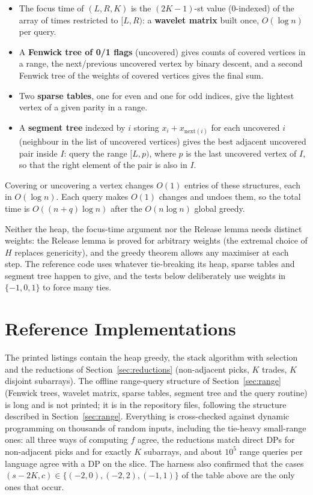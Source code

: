\documentclass[11pt]{article}
\begin{document}
\begin{itemize}[leftmargin=1.5em,itemsep=1pt]
  \item The focus time of $(L,R,K)$ is the $(2K-1)$-st value (0-indexed) of
        the array of times restricted to $[L,R)$: a \textbf{wavelet matrix}
        built once, $O(\log n)$ per query.
  \item A \textbf{Fenwick tree of 0/1 flags} (uncovered) gives counts of
        covered vertices in a range, the next/previous uncovered vertex by
        binary descent, and a second Fenwick tree of the weights of
        covered vertices gives the final sum.
  \item Two \textbf{sparse tables}, one for even and one for odd indices,
        give the lightest vertex of a given parity in a range.
  \item A \textbf{segment tree} indexed by $i$ storing $x_i+x_{\mathrm{next}(i)}$
        for each uncovered $i$ (neighbour in the list of uncovered vertices)
        gives the best adjacent uncovered pair inside $I$: query the range
        $[L,p)$, where $p$ is the last uncovered vertex of $I$, so that
        the right element of the pair is also in $I$.
\end{itemize}
Covering or uncovering a vertex changes $O(1)$ entries of these
structures, each in $O(\log n)$. Each query makes $O(1)$ changes and
undoes them, so the total time is $O((n+q)\log n)$ after the
$O(n\log n)$ global greedy.

\begin{notebox}[On ties]
Neither the heap, the focus-time argument nor the Release lemma needs
distinct weights: the Release lemma is proved for arbitrary weights (the
extremal choice of $H$ replaces genericity), and the greedy theorem allows
any maximiser at each step. The reference code uses whatever tie-breaking
its heap, sparse tables and segment tree happen to give, and the tests
below deliberately use weights in $\{-1,0,1\}$ to force many ties.
\end{notebox}

\section{Reference Implementations}\label{sec:code}
The printed listings contain the heap greedy, the stack algorithm with
selection and the reductions of Section~\ref{sec:reductions} (non-adjacent
picks, $K$ trades, $K$ disjoint subarrays). The offline range-query
structure of Section~\ref{sec:range} (Fenwick trees, wavelet matrix, sparse
tables, segment tree and the query routine) is long and is not printed;
it is in the repository files, following the structure described in
Section~\ref{sec:range}. Everything is cross-checked against dynamic programming on thousands of random
inputs, including the tie-heavy small-range ones: all three ways of computing
$f$ agree, the reductions match direct DPs for non-adjacent picks and for
exactly $K$ subarrays, and about $10^5$ range queries per language
agree with a DP on the slice. The harness also confirmed that the
cases $(s-2K,c)\in\{(-2,0),(-2,2),(-1,1)\}$ of the table above are the
only ones that occur.
\end{document}
